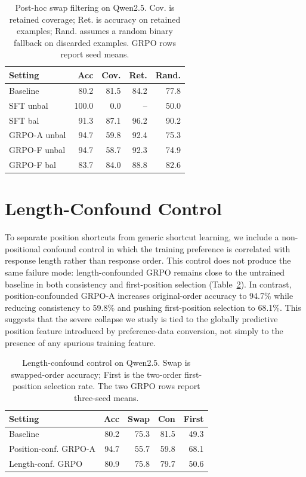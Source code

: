 \documentclass[letterpaper]{article}
\begin{document}
\begin{table}[htbp]
\centering
\scriptsize
\setlength{\tabcolsep}{3pt}
\begin{tabular}{@{}lrrrr@{}}
\toprule
\textbf{Setting} & \textbf{Acc} & \textbf{Cov.} & \textbf{Ret.} & \textbf{Rand.} \\
\midrule
Baseline & 80.2 & 81.5 & 84.2 & 77.8 \\
SFT unbal & 100.0 & 0.0 & -- & 50.0 \\
SFT bal & 91.3 & 87.1 & 96.2 & 90.2 \\
GRPO-A unbal & 94.7 & 59.8 & 92.4 & 75.3 \\
GRPO-F unbal & 94.7 & 58.7 & 92.3 & 74.9 \\
GRPO-F bal & 83.7 & 84.0 & 88.8 & 82.6 \\
\bottomrule
\end{tabular}
\caption{Post-hoc swap filtering on Qwen2.5. Cov. is retained coverage; Ret. is accuracy on retained examples; Rand. assumes a random binary fallback on discarded examples. GRPO rows report seed means.}
\label{tab:posthoc}
\end{table}

\section{Length-Confound Control}
\label{app:length}

To separate position shortcuts from generic shortcut learning, we include a non-positional confound control in which the training preference is correlated with response length rather than response order. This control does not produce the same failure mode: length-confounded GRPO remains close to the untrained baseline in both consistency and first-position selection (Table~\ref{tab:length}). In contrast, position-confounded GRPO-A increases original-order accuracy to 94.7\% while reducing consistency to 59.8\% and pushing first-position selection to 68.1\%. This suggests that the severe collapse we study is tied to the globally predictive position feature introduced by preference-data conversion, not simply to the presence of any spurious training feature.

\begin{table}[htbp]
\centering
\scriptsize
\setlength{\tabcolsep}{3pt}
\begin{tabular}{@{}lrrrr@{}}
\toprule
\textbf{Setting} & \textbf{Acc} & \textbf{Swap} & \textbf{Con} & \textbf{First} \\
\midrule
Baseline & 80.2 & 75.3 & 81.5 & 49.3 \\
Position-conf. GRPO-A & 94.7 & 55.7 & 59.8 & 68.1 \\
Length-conf. GRPO & 80.9 & 75.8 & 79.7 & 50.6 \\
\bottomrule
\end{tabular}
\caption{Length-confound control on Qwen2.5. Swap is swapped-order accuracy; First is the two-order first-position selection rate. The two GRPO rows report three-seed means.}
\label{tab:length}
\end{table}
\end{document}
